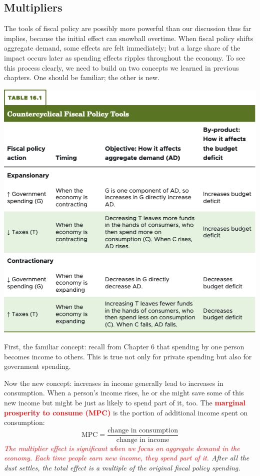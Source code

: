 \documentclass[11pt]{article} %
\begin{document}
\subsection*{Multipliers}
The tools of fiscal policy are possibly more powerful than our discussion thus far implies, because the initial effect can snowball overtime. When fiscal policy shifts aggregate demand, some effects are felt immediately; but a large share of the impact occurs later as spending effects ripples throughout the economy. To see this process clearly, we need to build on two concepts we learned in previous chapters. One should be familiar; the other is new.

\begin{center}
\includegraphics[scale=0.5]{images/Table 16.1.png} 
\end{center}

First, the familiar concept: recall from Chapter 6 that spending by one person becomes income to others. This is true not only for private spending but also for government spending.

Now the new concept: increases in income generally lead to increases in consumption. When a person's income rises, he or she might save some of this new income but might be just as likely to spend part of it, too. The \textbf{\textcolor{red}{marginal prosperity to consume (MPC)}} is the portion of additional income spent on consumption:
\begin{equation}
\text{MPC} = \frac{\text{change in consumption}}{\text{change in income}}
\end{equation}
\textit{\textcolor{red}{The multiplier effect is significant when we focus on aggregate demand in the economy. Each time people earn new income, they spend part of it.} After all the dust settles, the total effect is a multiple of the original fiscal policy spending.}
\end{document}
